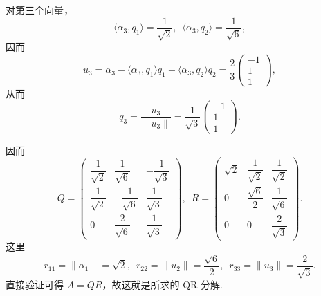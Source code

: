 \documentclass[UTF8,12pt,a4paper,fontset=fandol]{ctexart}
\begin{document}
\begin{solve}
    对第三个向量，
    \[
        \langle \alpha_3, q_1 \rangle = \frac{1}{\sqrt{2}}, \enspace
        \langle \alpha_3, q_2 \rangle = \frac{1}{\sqrt{6}},
    \]
    因而
    \[
        u_3 = \alpha_3 - \langle \alpha_3, q_1 \rangle q_1 - \langle \alpha_3, q_2 \rangle q_2
        = \frac{2}{3}
        \begin{pmatrix}
            -1 \\
            1 \\
            1
        \end{pmatrix},
    \]
    从而
    \[
        q_3 = \frac{u_3}{\lVert u_3 \rVert}
        = \frac{1}{\sqrt{3}}
        \begin{pmatrix}
            -1 \\
            1 \\
            1
        \end{pmatrix}.
    \]

    因而
    \[
        Q = \begin{pmatrix}
            \dfrac{1}{\sqrt{2}} & \dfrac{1}{\sqrt{6}}  & -\dfrac{1}{\sqrt{3}} \\
            \dfrac{1}{\sqrt{2}} & -\dfrac{1}{\sqrt{6}} & \dfrac{1}{\sqrt{3}}  \\
            0                   & \dfrac{2}{\sqrt{6}}  & \dfrac{1}{\sqrt{3}}
        \end{pmatrix}, \enspace
        R = \begin{pmatrix}
            \sqrt{2} & \dfrac{1}{\sqrt{2}} & \dfrac{1}{\sqrt{2}} \\
            0        & \dfrac{\sqrt{6}}{2} & \dfrac{1}{\sqrt{6}} \\
            0        & 0                   & \dfrac{2}{\sqrt{3}}
        \end{pmatrix}.
    \]
    这里
    \[
        r_{11} = \lVert \alpha_1 \rVert = \sqrt{2}, \enspace
        r_{22} = \lVert u_2 \rVert = \frac{\sqrt{6}}{2}, \enspace
        r_{33} = \lVert u_3 \rVert = \frac{2}{\sqrt{3}}.
    \]
    直接验证可得 $A = QR$，故这就是所求的 QR 分解.
\end{solve}
\end{document}
